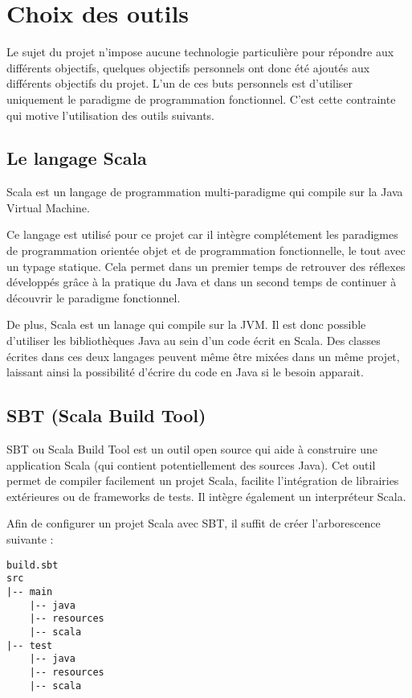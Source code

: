 \section{Choix des outils}

Le sujet du projet n'impose aucune technologie particulière pour répondre aux différents objectifs, quelques objectifs personnels ont donc été ajoutés aux différents objectifs du projet. L'un de ces buts personnels est d'utiliser uniquement le paradigme de programmation fonctionnel. C'est cette contrainte qui motive l'utilisation des outils suivants.

\subsection{Le langage Scala}

Scala est un langage de programmation multi-paradigme qui compile sur la Java Virtual Machine.

Ce langage est utilisé pour ce projet car il intègre complétement les paradigmes de programmation orientée objet et de programmation fonctionnelle, le tout avec un typage statique. Cela permet dans un premier temps de retrouver des réflexes développés grâce à la pratique du Java et dans un second temps de continuer à découvrir le paradigme fonctionnel.

De plus, Scala est un lanage qui compile sur la JVM. Il est donc possible d'utiliser les bibliothèques Java au sein d'un code écrit en Scala. Des classes écrites dans ces deux langages peuvent même être mixées dans un même projet, laissant ainsi la possibilité d'écrire du code en Java si le besoin apparait.

\subsection{SBT (Scala Build Tool)}

SBT ou Scala Build Tool est un outil open source qui aide à construire une application Scala (qui contient potentiellement des sources Java). Cet outil permet de compiler facilement un projet Scala, facilite l'intégration de librairies extérieures ou de frameworks de tests. Il intègre également un interpréteur Scala.

\newpage

Afin de configurer un projet Scala avec SBT, il suffit de créer l'arborescence suivante :

\begin{verbatim}
build.sbt
src
|-- main
    |-- java
    |-- resources
    |-- scala
|-- test
    |-- java
    |-- resources
    |-- scala
\end{verbatim}

